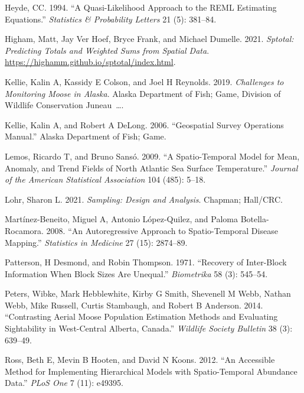 \documentclass[smallextended]{svjour3}       %
\newlength{\cslhangindent}
\newlength{\cslentryspacingunit} %
\newenvironment{CSLReferences}[2] %
 {%
  \setlength{\parindent}{0pt}
  \ifodd #1
  \let\oldpar\par
  \def\par{\hangindent=\cslhangindent\oldpar}
  \fi
  \setlength{\parskip}{#2\cslentryspacingunit}
 }%
 {}
\begin{document}
\begin{CSLReferences}{1}{0}
\leavevmode{}%
Heyde, CC. 1994. {``A Quasi-Likelihood Approach to the REML Estimating
Equations.''} \emph{Statistics \& Probability Letters} 21 (5): 381--84.

\leavevmode{}%
Higham, Matt, Jay Ver Hoef, Bryce Frank, and Michael Dumelle. 2021.
\emph{Sptotal: Predicting Totals and Weighted Sums from Spatial Data}.
\url{https://highamm.github.io/sptotal/index.html}.

\leavevmode{}%
Kellie, Kalin A, Kassidy E Colson, and Joel H Reynolds. 2019.
\emph{Challenges to Monitoring Moose in Alaska}. Alaska Department of
Fish; Game, Division of Wildlife Conservation Juneau~\ldots.

\leavevmode{}%
Kellie, Kalin A, and Robert A DeLong. 2006. {``Geospatial Survey
Operations Manual.''} Alaska Department of Fish; Game.

\leavevmode{}%
Lemos, Ricardo T, and Bruno Sansó. 2009. {``A Spatio-Temporal Model for
Mean, Anomaly, and Trend Fields of North Atlantic Sea Surface
Temperature.''} \emph{Journal of the American Statistical Association}
104 (485): 5--18.

\leavevmode{}%
Lohr, Sharon L. 2021. \emph{Sampling: Design and Analysis}. Chapman;
Hall/CRC.

\leavevmode{}%
Martínez-Beneito, Miguel A, Antonio López-Quilez, and Paloma
Botella-Rocamora. 2008. {``An Autoregressive Approach to Spatio-Temporal
Disease Mapping.''} \emph{Statistics in Medicine} 27 (15): 2874--89.

\leavevmode{}%
Patterson, H Desmond, and Robin Thompson. 1971. {``Recovery of
Inter-Block Information When Block Sizes Are Unequal.''}
\emph{Biometrika} 58 (3): 545--54.

\leavevmode{}%
Peters, Wibke, Mark Hebblewhite, Kirby G Smith, Shevenell M Webb, Nathan
Webb, Mike Russell, Curtis Stambaugh, and Robert B Anderson. 2014.
{``Contrasting Aerial Moose Population Estimation Methods and Evaluating
Sightability in West-Central Alberta, Canada.''} \emph{Wildlife Society
Bulletin} 38 (3): 639--49.

\leavevmode{}%
Ross, Beth E, Mevin B Hooten, and David N Koons. 2012. {``An Accessible
Method for Implementing Hierarchical Models with Spatio-Temporal
Abundance Data.''} \emph{PLoS One} 7 (11): e49395.


\end{CSLReferences}
\end{document}
